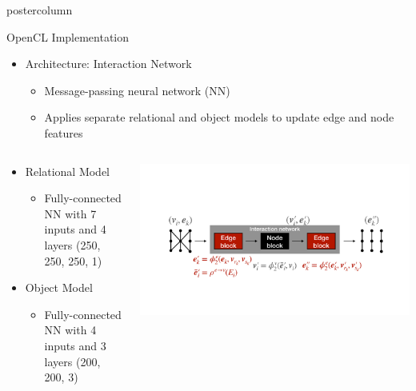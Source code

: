 \documentclass[final,hyperref={pdfpagelabels=false}]{beamer}
\begin{document}
\begin{frame}
\begin{columns}
\begin{column}{.49\textwidth}
\begin{beamercolorbox}[center,wd=\textwidth]{postercolumn}
\begin{minipage}[T]{.95\textwidth}
{            \begin{block}{OpenCL Implementation}
              \begin{itemize}
                \item Architecture: Interaction Network
                \begin{itemize}
                  \item Message-passing neural network (NN)
                  \item Applies separate relational and object models to update edge and node features
                \end{itemize}
              \end{itemize}
              \begin{columns}              
              \begin{column}{.49\textwidth}
                \begin{itemize}
                  \item Relational Model
                  \begin{itemize}
                    \item Fully-connected NN with 7 inputs and 4 layers (250, 250, 250, 1)
                  \end{itemize}
                  \item Object Model
                  \begin{itemize}
                    \item Fully-connected NN with 4 inputs and 3 layers (200, 200, 3)
                  \end{itemize}
                \end{itemize}
              \end{column}
            \begin{column}{.49\textwidth}
             \begin{center}
                    \includegraphics[width=0.9\linewidth]{OpenCL_GNN.pdf}
                  \end{center}
                \end{column}
                \end{columns}
              \end{block}
              
}
\end{minipage}
\end{beamercolorbox}
\end{column}
\end{columns}
\end{frame}
\end{document}
